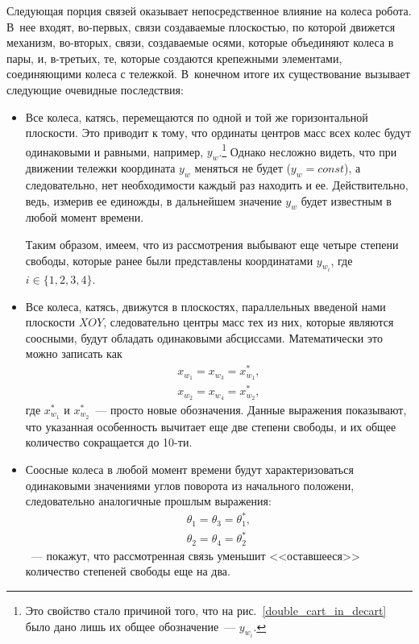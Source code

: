 \documentclass[12pt,a4paper,openany]{extarticle}
\begin{document}
Следующая порция связей оказывает непосредственное влияние на колеса робота.
В~нее входят, во-первых, связи создаваемые плоскостью, по которой движется механизм, во-вторых, связи, создаваемые осями, которые объединяют колеса в пары, и, в-третьих, те, которые создаются крепежными элементами, соединяющими колеса с тележкой.
В~конечном итоге их существование вызывает следующие очевидные последствия:
\begin{itemize}
	\item Все колеса, катясь, перемещаются по одной и той же горизонтальной плоскости. 
	Это приводит к тому, что ординаты центров масс всех колес будут одинаковыми и равными, например, $y_w$\lefteqn.\footnote{Это свойство стало причиной того, что на рис.~\ref{double_cart_in_decart} было дано лишь их общее обозначение~--- $y_{w_i}$.}
	Однако несложно видеть, что при движении тележки координата $y_w$ меняться не будет ($y_w = const$), а следовательно, нет необходимости каждый раз находить и ее. 
	Действительно, ведь, измерив ее единожды, в дальнейшем значение $y_w$ будет известным в любой момент времени.
	
	Таким образом, имеем, что из рассмотрения выбывают еще четыре степени свободы, которые ранее были представлены координатами $y_{w_i}$, где $i\in\{1,2,3,4\}$.
	\item Все колеса, катясь, движутся в плоскостях, параллельных введеной нами плоскости $XOY$, следовательно центры масс тех из них, которые являются соосными, будут обладать одинаковыми абсциссами. 
	Математически это можно записать как 
	\begin{gather}
		x_{w_1} = x_{w_3} = x_{w_1}^*, \\
		x_{w_2} = x_{w_4} = x_{w_2}^*,
	\end{gather}
	где $x_{w_1}^*$ и $x_{w_2}^*$~--- просто новые обозначения.
	Данные выражения показывают, что указанная особенность вычитает еще две степени свободы, и их общее количество сокращается до 10-ти.
	\item Соосные колеса в любой момент времени будут характеризоваться одинаковыми  значениями углов поворота из начального положени, следовательно аналогичные прошлым выражения:
	\begin{gather}
		\theta_1 = \theta_3 = \theta_1^*, \\
		\theta_2 = \theta_4 = \theta_2^*
	\end{gather}
	~--- покажут, что рассмотренная связь уменьшит <<оставшееся>> количество степеней свободы еще на два.
\end{itemize}
\end{document}
